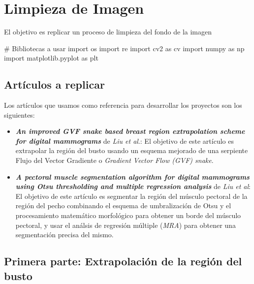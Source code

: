 \documentclass[
]{article}
\newenvironment{Shaded}{\begin{snugshade}}{\end{snugshade}}
\newcommand{\CommentTok}[1]{\textcolor[rgb]{0.54,0.53,0.53}{#1}}
\newcommand{\ImportTok}[1]{\textcolor[rgb]{1.00,0.33,0.00}{#1}}
\newcommand{\NormalTok}[1]{\textcolor[rgb]{0.12,0.11,0.11}{#1}}
\begin{document}
\hypertarget{limpieza-de-imagen}{%
\section{Limpieza de Imagen}\label{limpieza-de-imagen}}

El objetivo es replicar un proceso de limpieza del fondo de la imagen

\begin{Shaded}
\begin{Highlighting}[]
\CommentTok{\# Bibliotecas a usar}
\ImportTok{import}\NormalTok{ os}
\ImportTok{import}\NormalTok{ re}
\ImportTok{import}\NormalTok{ cv2 }\ImportTok{as}\NormalTok{ cv}
\ImportTok{import}\NormalTok{ numpy }\ImportTok{as}\NormalTok{ np}
\ImportTok{import}\NormalTok{ matplotlib.pyplot }\ImportTok{as}\NormalTok{ plt}
\end{Highlighting}
\end{Shaded}

\hypertarget{artuxedculos-a-replicar}{%
\subsection{Artículos a replicar}\label{artuxedculos-a-replicar}}

Los artículos que usamos como referencia para desarrollar los proyectos
son los siguientes:

\begin{itemize}
\item
  \textbf{\emph{An improved GVF snake based breast region extrapolation
  scheme for digital mammograms}} de \emph{Liu et al}.: El objetivo de
  este artículo es extrapolar la región del busto usando un esquema
  mejorado de una serpiente Flujo del Vector Gradiente o \emph{Gradient
  Vector Flow (GVF) snake}.
\item
  \textbf{\emph{A pectoral muscle segmentation algorithm for digital
  mammograms using Otsu thresholding and multiple regression analysis}}
  de \emph{Liu et al}: El objetivo de este artículo es segmentar la
  región del músculo pectoral de la región del pecho combinando el
  esquema de umbralización de Otsu y el procesamiento matemático
  morfológico para obtener un borde del músculo pectoral, y usar el
  análsis de regresión múltiple (\emph{MRA}) para obtener una
  segmentación precisa del mismo.
\end{itemize}

\hypertarget{primera-parte-extrapolaciuxf3n-de-la-regiuxf3n-del-busto}{%
\subsection{Primera parte: Extrapolación de la región del
busto}\label{primera-parte-extrapolaciuxf3n-de-la-regiuxf3n-del-busto}}
\end{document}
